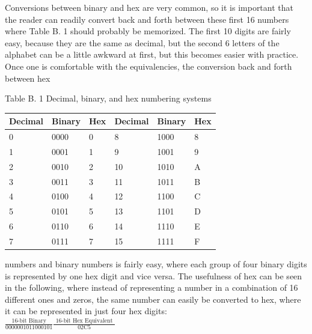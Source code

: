 \documentclass[10pt]{book}
\begin{document}
\begin{center}
\begin{center}
\begin{center}
\begin{center}
\begin{center}
Conversions between binary and hex are very common, so it is important that the reader can readily convert back and forth between these first 16 numbers where Table B. 1 should probably be memorized. The first 10 digits are fairly easy, because they are the same as decimal, but the second 6 letters of the alphabet can be a little awkward at first, but this becomes easier with practice. Once one is comfortable with the equivalencies, the conversion back and forth between hex

Table B. 1 Decimal, binary, and hex numbering systems

\begin{center}
\begin{tabular}{|l|l|l|l|l|l|}
\hline
Decimal & Binary & Hex & Decimal & Binary & Hex \\
\hline
0 & 0000 & 0 & 8 & 1000 & 8 \\
\hline
1 & 0001 & 1 & 9 & 1001 & 9 \\
\hline
2 & 0010 & 2 & 10 & 1010 & A \\
\hline
3 & 0011 & 3 & 11 & 1011 & B \\
\hline
4 & 0100 & 4 & 12 & 1100 & C \\
\hline
5 & 0101 & 5 & 13 & 1101 & D \\
\hline
6 & 0110 & 6 & 14 & 1110 & E \\
\hline
7 & 0111 & 7 & 15 & 1111 & F \\
\hline
\end{tabular}
\end{center}

numbers and binary numbers is fairly easy, where each group of four binary digits is represented by one hex digit and vice versa. The usefulness of hex can be seen in the following, where instead of representing a number in a combination of 16 different ones and zeros, the same number can easily be converted to hex, where it can be represented in just four hex digits:\\
$\frac{\text { 16-bit Binary }}{0000001011000101} \frac{\text { 16-bit Hex Equivalent }}{02 \mathrm{C} 5}$


\end{center}
\end{center}
\end{center}
\end{center}
\end{center}
\end{document}
